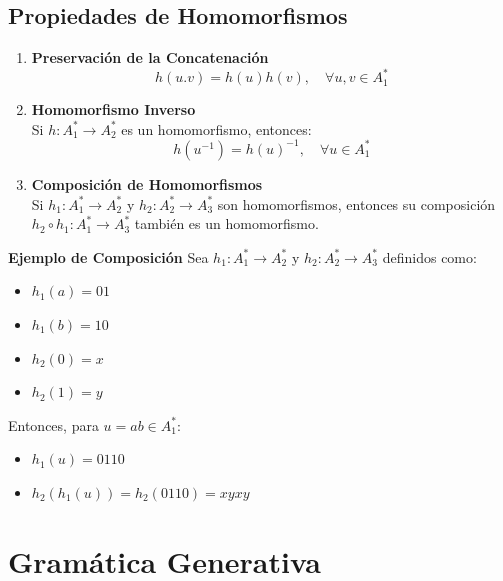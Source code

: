 \documentclass[12pt]{book} %
\begin{document}
\hypertarget{propiedades-de-homomorfismos}{%
\subsection{Propiedades de
Homomorfismos}\label{propiedades-de-homomorfismos}}

\begin{enumerate}
\def\labelenumi{\arabic{enumi}.}
\item
  \textbf{Preservación de la Concatenación}\\
  \[
   h(u.v) = h(u)h(v), \quad \forall u, v \in A_1^*
   \]
\item
  \textbf{Homomorfismo Inverso}\\
  Si \(h : A_1^* \to A_2^*\) es un homomorfismo, entonces: \[
   h(u^{-1}) = h(u)^{-1}, \quad \forall u \in A_1^*
   \]
\item
  \textbf{Composición de Homomorfismos}\\
  Si \(h_1 : A_1^* \to A_2^*\) y \(h_2 : A_2^* \to A_3^*\) son
  homomorfismos, entonces su composición
  \(h_2 \circ h_1 : A_1^* \to A_3^*\) también es un homomorfismo.
\end{enumerate}

\begin{ejemplo}
    \textbf{Ejemplo de Composición}  
    Sea $h_1 : A_1^* \to A_2^*$ y $h_2 : A_2^* \to A_3^*$ definidos como:

    \begin{itemize}
        \item $h_1(a) = 01$
        \item $h_1(b) = 10$
        \item $h_2(0) = x$
        \item $h_2(1) = y$
    \end{itemize}

    Entonces, para $u = ab \in A_1^*$:

    \begin{itemize}
        \item $h_1(u) = 0110$
        \item $h_2(h_1(u)) = h_2(0110) = xyxy$
    \end{itemize}
\end{ejemplo}

\hypertarget{gramuxe1tica-generativa}{%
\section{Gramática Generativa}\label{gramuxe1tica-generativa}}
\end{document}
